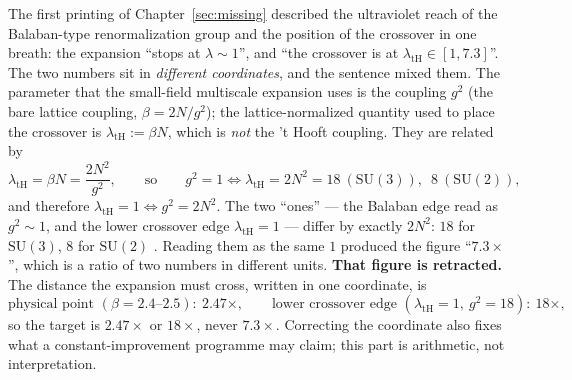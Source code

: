 The first printing of Chapter~\ref{sec:missing} described the ultraviolet reach of the
Balaban-type renormalization group and the position of the crossover in one breath: the expansion
``stops at $\lambda\sim1$'', and ``the crossover is at $\lambda_{\mathrm{tH}}\in[1,7.3]$''. The two
numbers sit in \emph{different coordinates}, and the sentence mixed them. The parameter that the
small-field multiscale expansion uses is the coupling $g^2$ (the bare lattice coupling,
$\beta=2N/g^2$); the lattice-normalized quantity used to place the crossover is
$\lambda_{\mathrm{tH}}:=\beta N$, which is \emph{not} the 't Hooft coupling. They are related by
\[
  \lambda_{\mathrm{tH}}=\beta N=\frac{2N^2}{g^2},
  \qquad\text{so}\qquad
  g^2=1\iff\lambda_{\mathrm{tH}}=2N^2=18\ (\mathrm{SU}(3)),\ \;8\ (\mathrm{SU}(2)),
\]
and therefore $\lambda_{\mathrm{tH}}=1\iff g^2=2N^2$. The two ``ones'' --- the Balaban edge read
as $g^2\sim1$, and the lower crossover edge $\lambda_{\mathrm{tH}}=1$ --- differ by exactly
$2N^2$: $18$ for $\mathrm{SU}(3)$, $8$ for $\mathrm{SU}(2)$ \LT. Reading them as the same $1$ produced
the figure ``$7.3\times$'', which is a ratio of two numbers in different units. \textbf{That figure
is retracted.} The distance the expansion must cross, written in one coordinate, is \LE
\[
  \text{physical point }(\beta=2.4\text{--}2.5)\!:\ 2.47\times,
  \qquad
  \text{lower crossover edge }(\lambda_{\mathrm{tH}}=1,\ g^2=18)\!:\ 18\times,
\]
so the target is $2.47\times$ or $18\times$, never $7.3\times$. Correcting the coordinate also
fixes what a constant-improvement programme may claim; this part is arithmetic, not interpretation.
